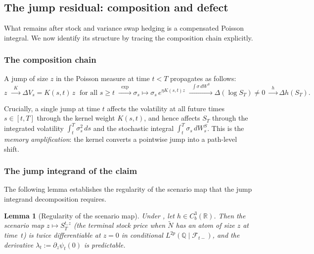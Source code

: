 \documentclass[11pt,a4paper]{article}
\theoremstyle{plain}
\newtheorem{lemma}[theorem]{Lemma}
\theoremstyle{definition}
\theoremstyle{remark}
\newcommand{\R}{\mathbb{R}}
\newcommand{\QQ}{\mathbb{Q}}
\newcommand{\F}{\mathcal{F}}
\newcommand{\Ntilde}{\widetilde{N}}
\begin{document}
\subsection{The jump residual: composition and defect}

What remains after stock and variance swap hedging is a
compensated Poisson integral.  We now identify its structure
by tracing the composition chain explicitly.

\subsubsection{The composition chain}

A jump of size $z$ in the Poisson measure at time $t < T$
propagates as follows:
\begin{equation}\label{eq:composition-chain}
  z \;\xrightarrow{\;\;K\;\;}
  \Delta V_s = K(s,t)\,z \;\text{ for all }s \geq t
  \;\xrightarrow{\;\;\exp\;\;}
  \sigma_s \mapsto \sigma_s\,e^{\eta K(s,t)z}
  \;\xrightarrow{\;\;\int\sigma\,dW^S\;\;}
  \Delta(\log S_T) \neq 0
  \;\xrightarrow{\;\;h\;\;}
  \Delta h(S_T).
\end{equation}

Crucially, a single jump at time $t$ affects the volatility
at all future times $s \in [t,T]$ through the kernel weight
$K(s,t)$, and hence affects $S_T$ through the integrated
volatility $\int_t^T \sigma_s^2\,ds$ and the stochastic
integral $\int_t^T \sigma_s\,dW_s^S$.  This is the
\emph{memory amplification}: the kernel converts a pointwise
jump into a path-level shift.


\subsubsection{The jump integrand of the claim}

The following lemma establishes the regularity of the
scenario map that the jump integrand decomposition requires.

\begin{lemma}[Regularity of the scenario map]\label{lem:scenario-reg}
Under ,
let $h \in C_b^3(\R)$.  Then the scenario map
$z \mapsto S_T^{t,z}$ (the terminal stock price when
$\Ntilde$ has an atom of size $z$ at time~$t$) is
twice differentiable at $z = 0$ in conditional
$L^{2p}(\QQ \mid \F_{t-})$, and the derivative
$\lambda_t := \partial_z \psi_t(0)$ is predictable.
\end{lemma}
\end{document}
